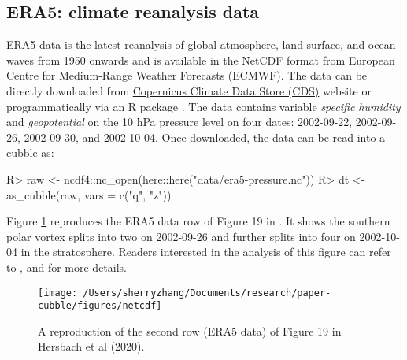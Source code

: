 \documentclass[
]{jss}
\begin{document}
\hypertarget{era5-climate-reanalysis-data}{%
\subsection{ERA5: climate reanalysis data}\label{era5-climate-reanalysis-data}}

ERA5 data \citep{hersbach2020era5} is the latest reanalysis of global atmosphere, land surface, and ocean waves from 1950 onwards and is available in the NetCDF format from European Centre for Medium-Range Weather Forecasts (ECMWF). The data can be directly downloaded from \href{https://cds.climate.copernicus.eu/cdsapp\#!/dataset/reanalysis-era5-pressure-levels?tab=overview}{Copernicus Climate Data Store (CDS)} website or programmatically via an R package  \citep{ecwmfr}. The  data contains variable \emph{specific humidity} and \emph{geopotential} on the 10 hPa pressure level on four dates: 2002-09-22, 2002-09-26, 2002-09-30, and 2002-10-04. Once downloaded, the data can be read into a cubble as:

\begin{CodeChunk}
\begin{CodeInput}
R> raw <- ncdf4::nc_open(here::here("data/era5-pressure.nc"))
R> dt <- as_cubble(raw, vars = c("q", "z"))
\end{CodeInput}
\end{CodeChunk}

Figure \ref{fig:netcdf} reproduces the ERA5 data row of Figure 19 in \citet{hersbach2020era5}. It shows the southern polar vortex splits into two on 2002-09-26 and further splits into four on 2002-10-04 in the stratosphere. Readers interested in the analysis of this figure can refer to \citet{hersbach2020era5}, \citet{simmons2020global} and \citet{simmons2005ecmwf} for more details.

\begin{CodeChunk}
\begin{figure}

{\centering \texttt{[image: /Users/sherryzhang/Documents/research/paper-cubble/figures/netcdf]} 

}

\caption[A reproduction of the second row (ERA5 data) of Figure 19 in  Hersbach et al (2020)]{A reproduction of the second row (ERA5 data) of Figure 19 in  Hersbach et al (2020).}\label{fig:netcdf}
\end{figure}
\end{CodeChunk}
\end{document}
